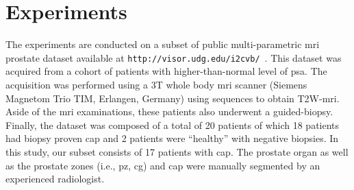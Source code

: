 \section{Experiments}
\label{sec:exp}
The experiments are conducted on a subset of public multi-parametric \ac{mri} prostate dataset available at \texttt{http://visor.udg.edu/i2cvb/}~\cite{lemaitre2015boosting}.
This dataset was acquired from a cohort of patients with higher-than-normal level of \ac{psa}. The acquisition was performed using a 3T whole body \ac{mri} scanner (Siemens Magnetom Trio TIM, Erlangen, Germany) using sequences to obtain T2W-\ac{mri}. Aside of the \ac{mri} examinations, these patients also underwent a guided-biopsy. Finally, the dataset was composed of a total of 20 patients of which 18 patients had biopsy proven \ac{cap} and 2 patients were ``healthy'' with negative biopsies. In this study, our subset consists of 17 patients with \ac{cap}. The prostate organ as well as the prostate zones (i.e., \ac{pz}, \ac{cg}) and \ac{cap} were manually segmented by an experienced radiologist.